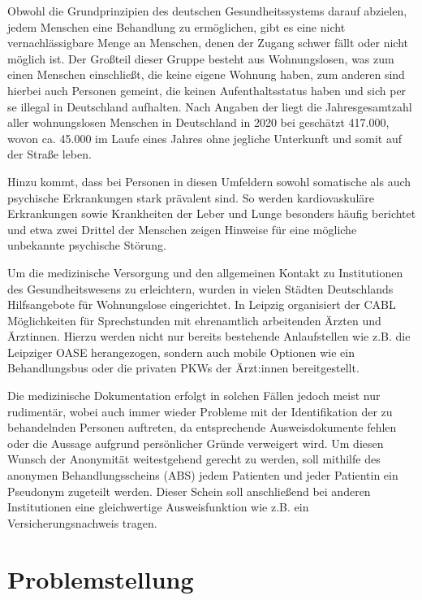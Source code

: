 Obwohl die Grundprinzipien des deutschen Gesundheitssystems darauf abzielen, jedem Menschen eine Behandlung zu ermöglichen, gibt es eine nicht vernachlässigbare Menge an Menschen, denen der Zugang schwer fällt oder nicht möglich ist. Der Großteil dieser Gruppe besteht aus Wohnungslosen, was zum einen Menschen einschließt, die keine eigene Wohnung haben, zum anderen sind hierbei auch Personen gemeint, die keinen Aufenthaltsstatus haben und sich per se illegal in Deutschland aufhalten. Nach Angaben der \citet{BAGWohnungslosenhilfe.2021} liegt die Jahresgesamtzahl aller wohnungslosen Menschen in Deutschland in 2020 bei geschätzt 417.000, wovon ca. 45.000 im Laufe eines Jahres ohne jegliche Unterkunft und somit auf der Straße leben.

Hinzu kommt, dass bei Personen in diesen Umfeldern sowohl somatische als auch psychische Erkrankungen stark prävalent sind. So werden kardiovaskuläre Erkrankungen sowie Krankheiten der Leber und Lunge besonders häufig berichtet und etwa zwei Drittel der Menschen zeigen Hinweise für eine mögliche unbekannte psychische Störung. \citep{DAE228829}

Um die medizinische Versorgung und den allgemeinen Kontakt zu Institutionen des Gesundheitswesens zu erleichtern, wurden in vielen Städten Deutschlands Hilfsangebote für Wohnungslose eingerichtet. In Leipzig organisiert der \ac{CABL} Möglichkeiten für Sprechstunden mit ehrenamtlich arbeitenden Ärzten und Ärztinnen. Hierzu werden nicht nur bereits bestehende Anlaufstellen wie z.B. die Leipziger OASE herangezogen, sondern auch mobile Optionen wie ein Behandlungsbus oder die privaten PKWs der Ärzt:innen bereitgestellt.

Die medizinische Dokumentation erfolgt in solchen Fällen jedoch meist nur rudimentär, wobei auch immer wieder Probleme mit der Identifikation der zu behandelnden Personen auftreten, da entsprechende Ausweisdokumente fehlen oder die Aussage aufgrund persönlicher Gründe verweigert wird. Um diesen Wunsch der Anonymität weitestgehend gerecht zu werden, soll mithilfe des anonymen Behandlungsscheins (\acs{ABS}) jedem Patienten und jeder Patientin ein Pseudonym zugeteilt werden. Dieser Schein soll anschließend bei anderen Institutionen eine gleichwertige Ausweisfunktion wie z.B. ein Versicherungsnachweis tragen. \citep[vgl.]{CABL}


\section{Problemstellung}

